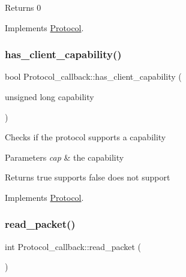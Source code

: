 \begin{DoxyReturn}{Returns}
0 
\end{DoxyReturn}


Implements \mbox{\hyperlink{classProtocol_a869af76c99d8e668112b65f7a2338ac8}{Protocol}}.

\mbox{\label{classProtocol__callback_a576ec71a457f4b71c3be94b0b59e053b}} 
\subsubsection{\texorpdfstring{has\+\_\+client\+\_\+capability()}{has\_client\_capability()}}
{\footnotesize\ttfamily bool Protocol\+\_\+callback\+::has\+\_\+client\+\_\+capability (\begin{DoxyParamCaption}\item[{unsigned long}]{capability }\end{DoxyParamCaption})\hspace{0.3cm}{\ttfamily [virtual]}}

Checks if the protocol supports a capability


\begin{DoxyParams}{Parameters}
{\em cap} & the capability\\
\hline
\end{DoxyParams}
\begin{DoxyReturn}{Returns}
true supports false does not support 
\end{DoxyReturn}


Implements \mbox{\hyperlink{classProtocol_aea1d05eaf76707b3772a00a43ea0e49b}{Protocol}}.

\mbox{\label{classProtocol__callback_a42c79ab20047c154ff73d8d732563928}} 
\subsubsection{\texorpdfstring{read\+\_\+packet()}{read\_packet()}}
{\footnotesize\ttfamily int Protocol\+\_\+callback\+::read\+\_\+packet (\begin{DoxyParamCaption}{ }\end{DoxyParamCaption})\hspace{0.3cm}{\ttfamily [virtual]}}

